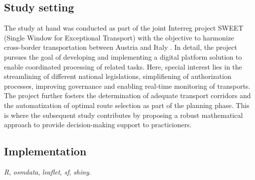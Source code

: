 %
\subsection{Study setting}
The study at hand was conducted as part of the joint Interreg project SWEET (Single Window for Exceptional Transport) with the objective to harmonize cross-border \ohc transportation between Austria and Italy \cite{Sweet}. In detail, the project pursues the goal of developing and implementing a digital platform solution to enable coordinated processing of \ohc related tasks. Here, special interest lies in the streamlining of different national legislations, simplifiening of authorization processes, improving governance and enabling real-time monitoring of transports. The project further fosters the determination of adequate transport corridors and the automatization of optimal route selection as part of the \ohc planning phase. This is where the subsequent study contributes by proposing a robust mathematical approach to provide decision-making support to practicioners.

\subsection{Implementation}

\textit{R}\cite{R},
\textit{osmdata}\cite{omsdataR},
\textit{leaflet}\cite{leafletR},
\textit{sf}\cite{sfR},
\textit{shiny}\cite{shinyR}.
